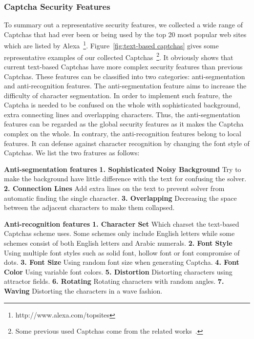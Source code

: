 \subsubsection{Captcha Security Features} \label{section: sccturity_features}
To summary out a representative security features, we collected a wide range of Captchas that had ever been or being used by the top 20 most popular web sites which are listed by Alexa~\footnote{http://www.alexa.com/topsites}. Figure~\ref{fig:text-based captchas} gives some representative examples of our collected Captchas~\footnote{Some previous used Captchas come from the related works~\cite{Gao2013The,Gao2016A,Bursztein2011Text}.}. It obviously shows that current text-based Captchas have more complex security features than previous Captchas. These features can be classified into two categories: anti-segmentation and anti-recognition features.
The anti-segmentation feature aims to increase the difficulty of character segmentation. In order to implement such feature, the Captcha is needed to be confused on the whole with sophisticated background, extra connecting lines and overlapping characters. Thus, the anti-segmentation features can be regarded as the global security features as it makes the Captcha complex on the whole.
In contrary, the anti-recognition features belong to local features. It can defense against character recognition by changing the font style of Captchas.
We list the two fratures as follows:

\noindent \textbf{Anti-segmentation features} \textbf{1. Sophisticated Noisy Background} Try to make the background have little difference with the text for confusing the solver. \textbf{2. Connection Lines} Add extra lines on the text to prevent solver from automatic finding the single character.
\textbf{3. Overlapping} Decreasing the space between the adjacent characters to make them collapsed.

\noindent \textbf{Anti-recognition features} \textbf{1. Character Set} Which charset the text-based Captchas scheme uses. Some schemes only include English letters while some schemes consist of both English letters and Arabic numerals. \textbf{2. Font Style} Using multiple font styles such as solid font, hollow font or font compromise of dots. \textbf{3. Font Size} Using random font size when generating Captcha. \textbf{4. Font Color} Using variable font colors. \textbf{5. Distortion} Distorting characters using attractor fields. \textbf{6. Rotating} Rotating characters with random angles. \textbf{7. Waving} Distorting the characters in a wave fashion.


